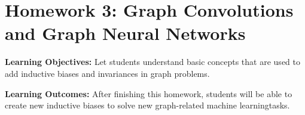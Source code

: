 \documentclass{article}
\newcommand{\homeworknumber}{3}
\begin{document}
%
\setcounter{section}{\homeworknumber}
\section*{%
    Homework \homeworknumber: Graph Convolutions and Graph Neural Networks
}

%
\noindent \textbf{Learning Objectives:}
%
Let students understand basic concepts that are used to add inductive biases and invariances in graph problems.
%
\hfill

%
\noindent \textbf{Learning Outcomes:}
%
After finishing this homework, students will be able to create new inductive
biases to solve new graph-related machine learningtasks.





%
\newpage

%




\end{document}
